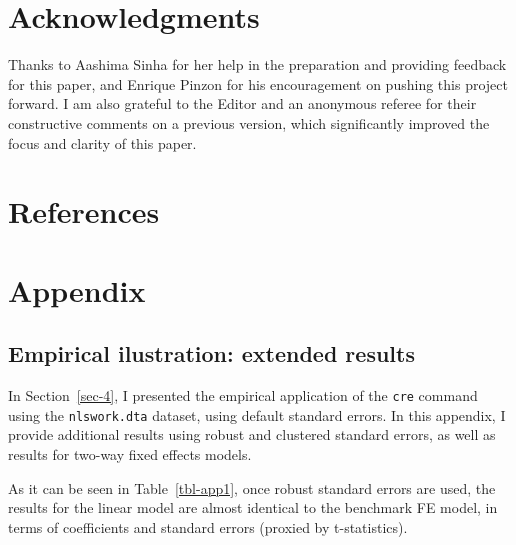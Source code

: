 \documentclass[bib]{statapress}
\begin{document}
\section{Acknowledgments}\label{acknowledgments}

Thanks to Aashima Sinha for her help in the preparation and providing
feedback for this paper, and Enrique Pinzon for his encouragement on
pushing this project forward. I am also grateful to the Editor and an
anonymous referee for their constructive comments on a previous version,
which significantly improved the focus and clarity of this paper.

\section{References}\label{references}

\renewcommand{\bibsection}{}


\newpage
\appendix

\section*{Appendix}\label{appendix}

\subsection*{Empirical ilustration: extended
results}\label{sec-appendix1}

In Section~\ref{sec-4}, I presented the empirical application of the
\texttt{cre} command using the \texttt{nlswork.dta} dataset, using
default standard errors. In this appendix, I provide additional results
using robust and clustered standard errors, as well as results for
two-way fixed effects models.

As it can be seen in Table~\ref{tbl-app1}, once robust standard errors
are used, the results for the linear model are almost identical to the
benchmark FE model, in terms of coefficients and standard errors
(proxied by t-statistics).
\end{document}
